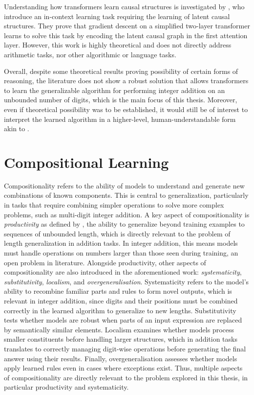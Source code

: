 Understanding how transformers learn causal structures is investigated by \cite{nichani_how_2024}, who introduce an in-context learning task requiring the learning of latent causal structures. They prove that gradient descent on a simplified two-layer transformer learns to solve this task by encoding the latent causal graph in the first attention layer. However, this work is highly theoretical and does not directly address arithmetic tasks, nor other algorithmic or language tasks.

Overall, despite some theoretical results proving possibility of certain forms of reasoning, the literature does not show a robust solution that allows transformers to learn the generalizable algorithm for performing integer addition on an unbounded number of digits, which is the main focus of this thesis. Moreover, even if theoretical possibility was to be established, it would still be of interest to interpret the learned algorithm in a higher-level, human-understandable form akin to \cite{nanda_progress_2022}.

\section{Compositional Learning}\label{sec:sota_compositional_learning}

Compositionality refers to the ability of models to understand and generate new combinations of known components. This is central to generalization, particularly in tasks that require combining simpler operations to solve more complex problems, such as multi-digit integer addition. A key aspect of compositionality is \emph{productivity} as defined by \cite{hupkes_compositionality_2020}, the ability to generalize beyond training examples to sequences of unbounded length, which is directly relevant to the problem of length generalization in addition tasks. In integer addition, this means models must handle operations on numbers larger than those seen during training, an open problem in literature. Alongside productivity, other aspects of compositionality are also introduced in the aforementioned work: \emph{systematicity}, \emph{substitutivity}, \emph{localism}, and \emph{overgeneralisation}. Systematicity refers to the model's ability to recombine familiar parts and rules to form novel outputs, which is relevant in integer addition, since digits and their positions must be combined correctly in the learned algorithm to generalize to new lengths. Substitutivity tests whether models are robust when parts of an input expression are replaced by semantically similar elements. Localism examines whether models process smaller constituents before handling larger structures, which in addition tasks translates to correctly managing digit-wise operations before generating the final answer using their results. Finally, overgeneralisation assesses whether models apply learned rules even in cases where exceptions exist. Thus, multiple aspects of compositionality are directly relevant to the problem explored in this thesis, in particular productivity and systematicity.

